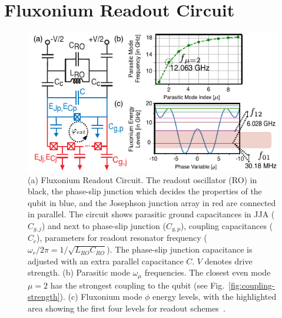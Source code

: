 \documentclass[prx,showpacs,notitlepage,twocolumn,superscriptaddress,nofootinbib,preprintnumbers,floatfix]{revtex4-2}
\begin{document}
\section{Fluxonium Readout Circuit}\label{sec:Fluxonium}
\begin{figure}[htb]
\centering    
\includegraphics[width=\linewidth]{Figures/Meas_Circuit.pdf}
\caption{(a) Fluxonium Readout Circuit. The readout oscillator (RO) in black, the phase-slip junction which decides the properties of the qubit in blue, and the Josephson junction array in red are connected in parallel. The circuit shows parasitic ground capacitances in JJA ($C_{g,j}$) and next to phase-slip junction ($C_{g,p}$), coupling capacitances ($C_c$), parameters for readout resonator frequency ($\omega_r/2\pi=1/\sqrt{L_{RO}C_{RO}}$). The phase-slip junction capacitance is adjusted with an extra parallel capacitance $C$. $V$ denotes drive strength. (b) Parasitic mode $\omega_\mu$ frequencies. The closest even mode $\mu = 2$ has the strongest coupling to the qubit (see Fig.~\ref{fig:coupling-strength}). (c) Fluxonium mode $\phi$ energy levels, with the highlighted area showing the first four levels for readout schemes~\cite{zhang_universal_2021}. 
}
\label{fig:meas_circuit}
\end{figure}
\end{document}
